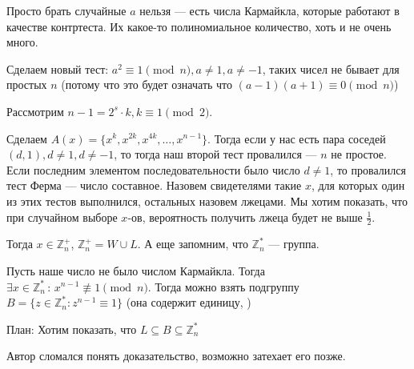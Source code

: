 \documentclass[12pt]{article}
\begin{document}
Просто брать случайные $a$ нельзя --- есть числа Кармайкла, которые работают в качестве контртеста. Их какое-то полиномиальное количество, хоть и не очень много.

Сделаем новый тест: $a^2 \equiv 1 \pmod{n}, a \neq 1, a \neq -1$, таких чисел не бывает для простых $n$ (потому что это будет означать что $(a - 1)(a + 1) \equiv 0 \pmod{n}$)

Рассмотрим $n - 1 = 2^s \cdot k, k \equiv 1 \pmod{2}$.

Сделаем $A(x) = \{x^k, x^{2k}, x^{4k}, \ldots, x^{n - 1}\}$. Тогда если у нас есть пара соседей  $(d, 1), d \neq 1, d \neq -1$, то тогда наш второй тест провалился --- $n$ не простое. Если последним элементом последовательности было число $d \neq 1$, то провалился тест Ферма --- число составное. Назовем свидетелями такие $x$, для которых один из этих тестов выполнился, остальных назовем лжецами. Мы хотим показать, что при случайном выборе $x$-ов, вероятность получить лжеца будет не выше $\frac{1}{2}$.

Тогда $x \in \mathbb{Z}_n^+$, $\mathbb{Z}_n^+ = W \cup L$.
А еще запомним, что $\mathbb{Z}_n^*$ --- группа.

Пусть наше число не было числом Кармайкла. Тогда $\exists x \in \mathbb{Z}_n^*\,:\,x^{n-1} \not\equiv 1 \pmod{n}$. Тогда можно взять подгруппу $B = \{z \in \mathbb{Z}_n^* : z^{n-1} \equiv 1\}$ (она содержит единицу, )



План: Хотим показать, что $L \subseteq B \subseteq \mathbb{Z}_n^*$

Автор сломался понять доказательство, возможно затехает его позже.
\end{document}
